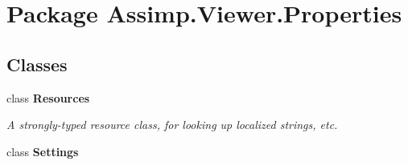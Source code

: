 \hypertarget{namespace_assimp_1_1_viewer_1_1_properties}{\section{Package Assimp.\+Viewer.\+Properties}
\label{namespace_assimp_1_1_viewer_1_1_properties}
}
\subsection*{Classes}
\begin{DoxyCompactItemize}
\item 
class {\bfseries Resources}
\begin{DoxyCompactList}\small\item\em A strongly-\/typed resource class, for looking up localized strings, etc. \end{DoxyCompactList}\item 
class {\bfseries Settings}
\end{DoxyCompactItemize}
